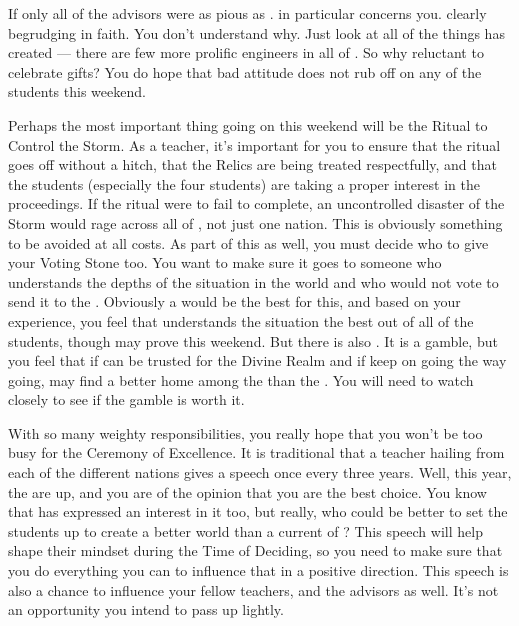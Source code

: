 \documentclass[char]{GL2020}
\begin{document}
If only all of the advisors were as pious as \cEbbPriest{}. \cBunker{\full} in particular concerns you. \cBunker{\Theyare} clearly begrudging in \cBunker{\their} faith. You don't understand why. Just look at all of the things \cBunker{} has created — there are few more prolific engineers in all of \pEarth{}. So why \cBunker{\are} \cBunker{\they} reluctant to celebrate \cBunker{\their} gifts? You do hope that \cBunker{\their} bad attitude does not rub off on any of the students this weekend.

Perhaps the most important thing going on this weekend will be the Ritual to Control the Storm. As a teacher, it's important for you to ensure that the ritual goes off without a hitch, that the Relics are being treated respectfully, and that the students (especially the four \pShip{} students) are taking a proper interest in the proceedings. If the ritual were to fail to complete, an uncontrolled disaster of the Storm would rage across all of \pEarth{}, not just one nation. This is obviously something to be avoided at all costs. As part of this as well, you must decide who to give your Voting Stone too. You want to make sure it goes to someone who understands the depths of the situation in the world and who would not vote to send it to the \pShip{}. Obviously a \pShippie{} would be the best for this, and based on your experience, you feel that \cWarlordDaughter{} understands the situation the best out of all of the students, though \cInitiate{} may prove \cInitiate{\themself} this weekend. But there is also \cAmbition{}. It is a gamble, but you feel that if \cAmbition{\they} can be trusted for the Divine Realm and if \cAmbition{\they} keep\cAmbition{\verbs} on going the way \cAmbition{\theyare} going, \cAmbition{\they} may find a better home among the \pShippies{} than the \pTech{}. You will need to watch \cAmbition{\them} closely to see if the gamble is worth it.  

With so many weighty responsibilities, you really hope that you won't be too busy for the Ceremony of Excellence. It is traditional that a teacher hailing from each of the different nations gives a speech once every three years. Well, this year, the \pShip{} are up, and you are of the opinion that you are the best choice. You know that \cPirate{} has expressed an interest in it too, but really, who could be better to set the students up to create a better world than a current \cFlowPriest{\cleric} of \cFlowFull{\full}? This speech will help shape their mindset during the Time of Deciding, so you need to make sure that you do everything you can to influence that in a positive direction. This speech is also a chance to influence your fellow teachers, and the advisors as well. It's not an opportunity you intend to pass up lightly.
\end{document}
